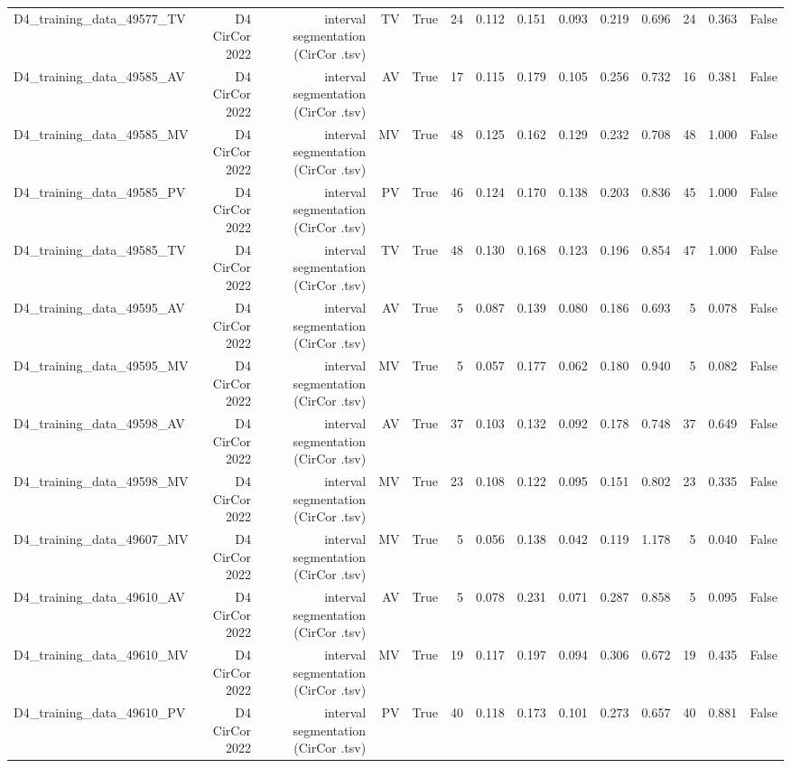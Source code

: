 \begin{table}[htbp]
\begin{tabular}{lrrrrrrrrrrrrr}
    D4\_training\_data\_49577\_TV & D4 CirCor 2022 & interval segmentation (CirCor .tsv) & TV & True & 24 & 0.112 & 0.151 & 0.093 & 0.219 & 0.696 & 24 & 0.363 & False \\
    D4\_training\_data\_49585\_AV & D4 CirCor 2022 & interval segmentation (CirCor .tsv) & AV & True & 17 & 0.115 & 0.179 & 0.105 & 0.256 & 0.732 & 16 & 0.381 & False \\
    D4\_training\_data\_49585\_MV & D4 CirCor 2022 & interval segmentation (CirCor .tsv) & MV & True & 48 & 0.125 & 0.162 & 0.129 & 0.232 & 0.708 & 48 & 1.000 & False \\
    D4\_training\_data\_49585\_PV & D4 CirCor 2022 & interval segmentation (CirCor .tsv) & PV & True & 46 & 0.124 & 0.170 & 0.138 & 0.203 & 0.836 & 45 & 1.000 & False \\
    D4\_training\_data\_49585\_TV & D4 CirCor 2022 & interval segmentation (CirCor .tsv) & TV & True & 48 & 0.130 & 0.168 & 0.123 & 0.196 & 0.854 & 47 & 1.000 & False \\
    D4\_training\_data\_49595\_AV & D4 CirCor 2022 & interval segmentation (CirCor .tsv) & AV & True & 5 & 0.087 & 0.139 & 0.080 & 0.186 & 0.693 & 5 & 0.078 & False \\
    D4\_training\_data\_49595\_MV & D4 CirCor 2022 & interval segmentation (CirCor .tsv) & MV & True & 5 & 0.057 & 0.177 & 0.062 & 0.180 & 0.940 & 5 & 0.082 & False \\
    D4\_training\_data\_49598\_AV & D4 CirCor 2022 & interval segmentation (CirCor .tsv) & AV & True & 37 & 0.103 & 0.132 & 0.092 & 0.178 & 0.748 & 37 & 0.649 & False \\
    D4\_training\_data\_49598\_MV & D4 CirCor 2022 & interval segmentation (CirCor .tsv) & MV & True & 23 & 0.108 & 0.122 & 0.095 & 0.151 & 0.802 & 23 & 0.335 & False \\
    D4\_training\_data\_49607\_MV & D4 CirCor 2022 & interval segmentation (CirCor .tsv) & MV & True & 5 & 0.056 & 0.138 & 0.042 & 0.119 & 1.178 & 5 & 0.040 & False \\
    D4\_training\_data\_49610\_AV & D4 CirCor 2022 & interval segmentation (CirCor .tsv) & AV & True & 5 & 0.078 & 0.231 & 0.071 & 0.287 & 0.858 & 5 & 0.095 & False \\
    D4\_training\_data\_49610\_MV & D4 CirCor 2022 & interval segmentation (CirCor .tsv) & MV & True & 19 & 0.117 & 0.197 & 0.094 & 0.306 & 0.672 & 19 & 0.435 & False \\
    D4\_training\_data\_49610\_PV & D4 CirCor 2022 & interval segmentation (CirCor .tsv) & PV & True & 40 & 0.118 & 0.173 & 0.101 & 0.273 & 0.657 & 40 & 0.881 & False \\

\end{tabular}
\end{table}
